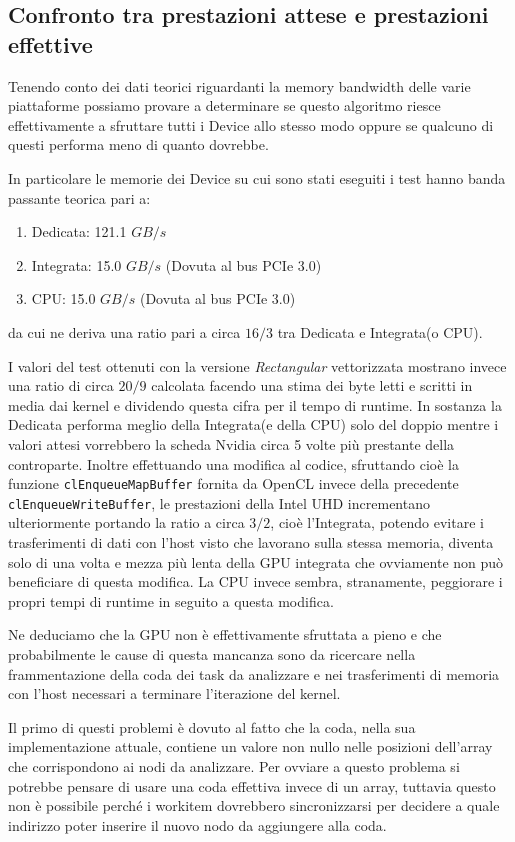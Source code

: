 \documentclass[../relazione.tex]{subfiles}
\begin{document}
\subsection{Confronto tra prestazioni attese e prestazioni effettive}
Tenendo conto dei dati teorici riguardanti la memory bandwidth delle varie piattaforme possiamo provare a determinare se questo algoritmo riesce effettivamente a sfruttare tutti i Device allo stesso modo oppure se qualcuno di questi performa meno di quanto dovrebbe.

In particolare le memorie dei Device su cui sono stati eseguiti i test hanno banda passante teorica pari a:
\begin{enumerate}
    \item Dedicata: 121.1 $GB/s$
    \item Integrata: 15.0 $GB/s$ (Dovuta al bus PCIe 3.0)
    \item CPU: 15.0 $GB/s$ (Dovuta al bus PCIe 3.0)
\end{enumerate}
da cui ne deriva una ratio pari a circa $16/3$ tra Dedicata e Integrata(o CPU).

I valori del test ottenuti con la versione \textit{Rectangular} vettorizzata mostrano invece una ratio di circa $20/9$ calcolata facendo una stima dei byte letti e scritti in media dai kernel e dividendo questa cifra per il tempo di runtime.
In sostanza la Dedicata performa meglio della Integrata(e della CPU) solo del doppio mentre i valori attesi vorrebbero la scheda Nvidia circa 5 volte più prestante della controparte.
Inoltre effettuando una modifica al codice, sfruttando cioè la funzione \lstinline{clEnqueueMapBuffer} fornita da OpenCL invece della precedente \lstinline{clEnqueueWriteBuffer}, le prestazioni della Intel UHD incrementano ulteriormente portando la ratio a circa $3/2$, cioè l'Integrata, potendo evitare i trasferimenti di dati con l'host visto che lavorano sulla stessa memoria, diventa solo di una volta e mezza più lenta della GPU integrata che ovviamente non può beneficiare di questa modifica.
La CPU invece sembra, stranamente, peggiorare i propri tempi di runtime in seguito a questa modifica.

Ne deduciamo che la GPU non è effettivamente sfruttata a pieno e che probabilmente le cause di questa mancanza sono da ricercare nella frammentazione della coda dei task da analizzare e nei trasferimenti di memoria con l'host necessari a terminare l'iterazione del kernel.

Il primo di questi problemi è dovuto al fatto che la coda, nella sua implementazione attuale, contiene un valore non nullo nelle posizioni dell'array che corrispondono ai nodi da analizzare. Per ovviare a questo problema si potrebbe pensare di usare una coda effettiva invece di un array, tuttavia questo non è possibile perché i workitem dovrebbero sincronizzarsi per decidere a quale indirizzo poter inserire il nuovo nodo da aggiungere alla coda.
\end{document}
